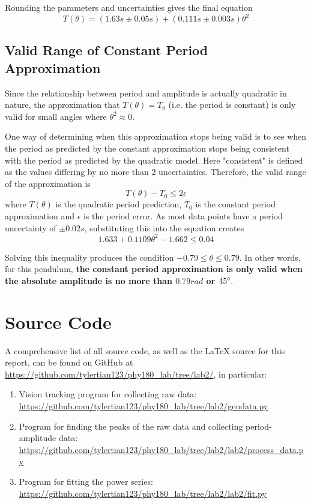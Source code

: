\documentclass[aps,twocolumn,secnumarabic,nobalancelastpage,amsmath,amssymb,nofootinbib,floatfix,letterpaper]{revtex4}
\begin{document}
Rounding the parameters and uncertainties gives the final equation
\begin{equation}
    T(\theta) = (1.63\si{s} \pm 0.05\si{s}) + (0.111\si{s} \pm 0.003\si{s})\theta^2
\end{equation}

\subsection{Valid Range of Constant Period Approximation}

Since the relationship between period and amplitude is actually quadratic in nature, the approximation that
$T(\theta) = T_0$ (i.e. the period is constant) is only valid for small angles where $\theta^2 \approx 0$.

One way of determining when this approximation stops being valid is to see when the period as predicted by the constant
approximation stops being consistent with the period as predicted by the quadratic model. Here "consistent" is defined
as the values differing by no more than 2 uncertainties. Therefore, the valid range of the approximation is
\begin{equation}
    T(\theta) - T_0 \leq 2\epsilon
\end{equation}
where $T(\theta)$ is the quadratic period prediction, $T_0$ is the constant period approximation and $\epsilon$ is the
period error. As most data points have a period uncertainty of $\pm 0.02\si{s}$, substituting this into the equation creates
\begin{equation}
    1.633 + 0.1109\theta^2 - 1.662 \leq 0.04
\end{equation}

Solving this inequality produces the condition $-0.79 \leq \theta \leq 0.79$. In other words, for this pendulum,
\textbf{the constant period approximation is only valid when the absolute amplitude is no more than $0.79\si{rad}$ or
$45\degree$}.


\appendix

\section{Source Code}

A comprehensive list of all source code, as well as the \LaTeX{} source for this report, can be found on GitHub at
\url{https://github.com/tylertian123/phy180_lab/tree/lab2/}, in particular:
\label{appendix:code}
\begin{enumerate}
    \item Vision tracking program for collecting raw data: \url{https://github.com/tylertian123/phy180_lab/tree/lab2/gendata.py}
    \item Program for finding the peaks of the raw data and collecting period-amplitude data: \url{https://github.com/tylertian123/phy180_lab/tree/lab2/lab2/process_data.py}
    \item Program for fitting the power series: \url{https://github.com/tylertian123/phy180_lab/tree/lab2/lab2/fit.py}
\end{enumerate}
\end{document}
